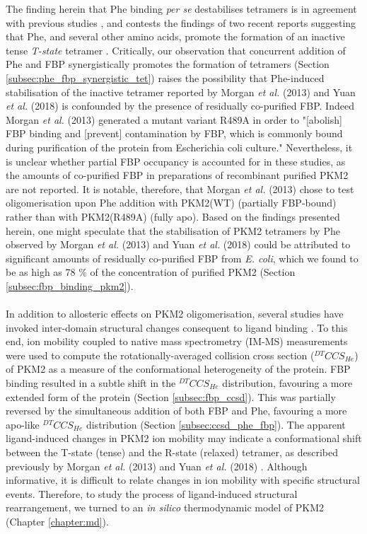 The finding herein that Phe binding \textit{per se} destabilises tetramers is in agreement with previous studies \cite{Hofmann:1975aa,Feliu:1976aa}, and contests the findings of two recent reports suggesting that Phe, and several other amino acids, promote the formation of an inactive tense \textit{T-state} tetramer \cite{Morgan:2013aa,Yuan:2018aa}. Critically, our observation that concurrent addition of Phe and FBP synergistically promotes the formation of tetramers (Section \ref{subsec:phe_fbp_synergistic_tet}) raises the possibility that Phe-induced stabilisation of the inactive tetramer reported by Morgan \textit{et al.} (2013) \cite{Morgan:2013aa} and Yuan \textit{et al.} (2018) \cite{Yuan:2018aa} is confounded by the presence of residually co-purified FBP. Indeed Morgan \textit{et al.} (2013) \cite{Morgan:2013aa} generated a mutant variant R489A in order to "[abolish] FBP binding and [prevent] contamination by FBP, which is commonly bound during purification of the protein from Escherichia coli culture." Nevertheless, it is unclear whether partial FBP occupancy is accounted for in these studies, as the amounts of co-purified FBP in preparations of recombinant purified PKM2 are not reported. It is notable, therefore, that Morgan \textit{et al.} (2013) \cite{Morgan:2013aa} chose to test oligomerisation upon Phe addition with PKM2(WT) (partially FBP-bound) rather than with PKM2(R489A) (fully apo). Based on the findings presented herein, one might speculate that the stabilisation of PKM2 tetramers by Phe observed by Morgan \textit{et al.} (2013) \cite{Morgan:2013aa} and Yuan \textit{et al.} (2018) \cite{Yuan:2018aa} could be attributed to significant amounts of residually co-purified FBP from \textit{E. coli}, which we found to be as high as 78 \% of the concentration of purified PKM2 (Section \ref{subsec:fbp_binding_pkm2}). 
%
%
\\\\
%
%
In addition to allosteric effects on PKM2 oligomerisation, several studies have invoked inter-domain structural changes consequent to ligand binding \cite{Dombrauckas:2005aa,Gehrig:2017aa,Morgan:2013aa,Yan:2016aa,Yuan:2018aa}. To this end, ion mobility coupled to native mass spectrometry (IM-MS) measurements were used to compute the rotationally-averaged collision cross section ($^{DT}CCS_{He}$) of PKM2 as a measure of the conformational heterogeneity of the protein. FBP binding resulted in a subtle shift in the $^{DT}CCS_{He}$ distribution, favouring a more extended form of the protein (Section \ref{subsec:fbp_ccsd}). This was partially reversed by the simultaneous addition of both FBP and Phe, favouring a more apo-like $^{DT}CCS_{He}$ distribution (Section \ref{subsec:ccsd_phe_fbp}). The apparent ligand-induced changes in PKM2 ion mobility may indicate a conformational shift between the T-state (tense) and the R-state (relaxed) tetramer, as described previously by Morgan \textit{et al.} (2013) \cite{Morgan:2013aa} and Yuan \textit{et al.} (2018) \cite{Yuan:2018aa}. Although informative, it is difficult to relate changes in ion mobility with specific structural events. Therefore, to study the process of ligand-induced structural rearrangement, we turned to an \textit{in silico} thermodynamic model of PKM2 (Chapter \ref{chapter:md}).
